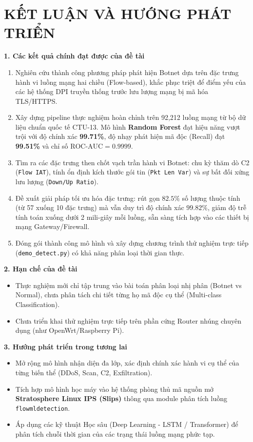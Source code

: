 \documentclass[12pt,a4paper,oneside]{report}
\begin{document}
\chapter*{KẾT LUẬN VÀ HƯỚNG PHÁT TRIỂN}

\textbf{1. Các kết quả chính đạt được của đề tài}
\begin{enumerate}
  \item Nghiên cứu thành công phương pháp phát hiện Botnet dựa trên đặc trưng hành vi luồng mạng hai chiều (Flow-based), khắc phục triệt để điểm yếu của các hệ thống DPI truyền thống trước lưu lượng mạng bị mã hóa TLS/HTTPS.
  \item Xây dựng pipeline thực nghiệm hoàn chỉnh trên 92,212 luồng mạng từ bộ dữ liệu chuẩn quốc tế CTU-13. Mô hình \textbf{Random Forest} đạt hiệu năng vượt trội với độ chính xác \textbf{99.71\%}, độ nhạy phát hiện mã độc (Recall) đạt \textbf{99.51\%} và chỉ số $\text{ROC-AUC} = 0.9999$.
  \item Tìm ra các đặc trưng then chốt vạch trần hành vi Botnet: chu kỳ thăm dò C2 (\texttt{Flow IAT}), tính ổn định kích thước gói tin (\texttt{Pkt Len Var}) và sự bất đối xứng lưu lượng (\texttt{Down/Up Ratio}).
  \item Đề xuất giải pháp tối ưu hóa đặc trưng: rút gọn $82.5\%$ số lượng thuộc tính (từ 57 xuống 10 đặc trưng) mà vẫn duy trì độ chính xác $99.82\%$, giảm độ trễ tính toán xuống dưới 2 mili-giây mỗi luồng, sẵn sàng tích hợp vào các thiết bị mạng Gateway/Firewall.
  \item Đóng gói thành công mô hình và xây dựng chương trình thử nghiệm trực tiếp (\texttt{demo\_detect.py}) có khả năng phân loại thời gian thực.
\end{enumerate}

\textbf{2. Hạn chế của đề tài}
\begin{itemize}
  \item Thực nghiệm mới chỉ tập trung vào bài toán phân loại nhị phân (Botnet vs Normal), chưa phân tách chi tiết từng họ mã độc cụ thể (Multi-class Classification).
  \item Chưa triển khai thử nghiệm trực tiếp trên phần cứng Router nhúng chuyên dụng (như OpenWrt/Raspberry Pi).
\end{itemize}

\textbf{3. Hướng phát triển trong tương lai}
\begin{itemize}
  \item Mở rộng mô hình nhận diện đa lớp, xác định chính xác hành vi cụ thể của từng biến thể (DDoS, Scan, C2, Exfiltration).
  \item Tích hợp mô hình học máy vào hệ thống phòng thủ mã nguồn mở \textbf{Stratosphere Linux IPS (Slips)} thông qua module phân tích luồng \texttt{flowmldetection}.
  \item Áp dụng các kỹ thuật Học sâu (Deep Learning - LSTM / Transformer) để phân tích chuỗi thời gian của các trạng thái luồng mạng phức tạp.
\end{itemize}
\end{document}
